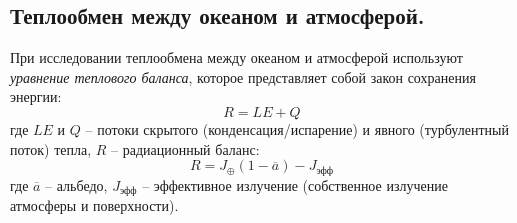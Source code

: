 \subsection{Теплообмен между океаном и атмосферой.}
При исследовании теплообмена между океаном и атмосферой используют \textit{уравнение теплового баланса}, которое представляет собой закон сохранения энергии:
\begin{equation}
R=LE+Q
\end{equation}
где $LE$ и $Q$ -- потоки скрытого (конденсация/испарение) и явного (турбулентный поток) тепла, $R$ -- радиационный баланс:
\begin{equation}
R=J_\oplus(1-\overline{a})-J_\text{эфф}
\end{equation}
где $\overline{a}$ -- альбедо, $J_\text{эфф}$ -- эффективное излучение (собственное излучение атмосферы и поверхности).
